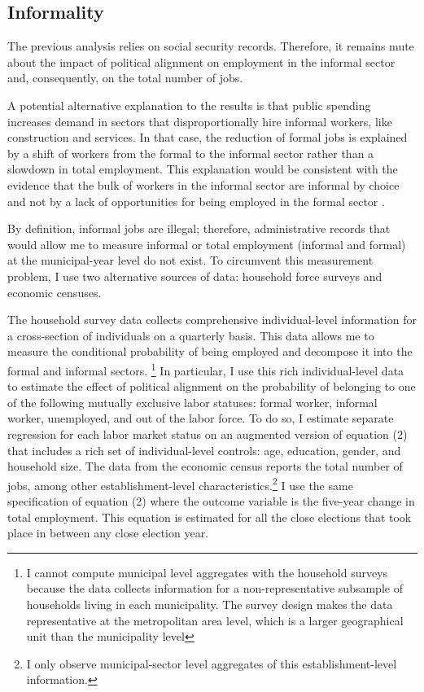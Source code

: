 \documentclass[dv_diss_main.tex]{subfiles}
\begin{document}
\subsection{Informality}
The previous analysis relies on social security records. Therefore, it remains mute about the impact of political alignment on employment in the informal sector and, consequently, on the total number of jobs.

A potential alternative explanation to the results is that public spending increases demand in sectors that disproportionally hire informal workers, like construction and services. In that case, the reduction of formal jobs is explained by a shift of workers from the formal to the informal sector rather than a slowdown in total employment. This explanation would be consistent with the evidence that the bulk of workers in the informal sector are informal by choice and not by a lack of opportunities for being employed in the formal sector \citep{alcaraz2015informality,maloney1999does}.

By definition, informal jobs are illegal; therefore, administrative records that would allow me to measure informal or total employment (informal and formal) at the municipal-year level do not exist. To circumvent this measurement problem, I use two alternative sources of data: household force surveys and economic censuses. 

The household survey data collects comprehensive individual-level information for a cross-section of individuals on a quarterly basis. This data allows me to measure the conditional probability of being employed and decompose it into the formal and informal sectors. 
\footnote{ I cannot compute municipal level aggregates with the household surveys because the data collects information for a non-representative subsample of households living in each municipality. The survey design makes the data representative at the metropolitan area level, which is a larger geographical unit than the municipality level }
In particular, I use this rich individual-level data to estimate the effect of political alignment on the probability of belonging to one of the following mutually exclusive labor statuses: formal worker, informal worker, unemployed, and out of the labor force. To do so, I estimate separate regression for each labor market status on an augmented version of equation (2) that includes a rich set of individual-level controls: age, education, gender, and household size. The data from the economic census reports the total number of jobs, among other establishment-level characteristics.\footnote{I only observe municipal-sector level aggregates of this establishment-level information.} I use the same specification of equation (2) where the outcome variable is the five-year change in total employment. This equation is estimated for all the close elections that took place in between any close election year. 
\end{document}
